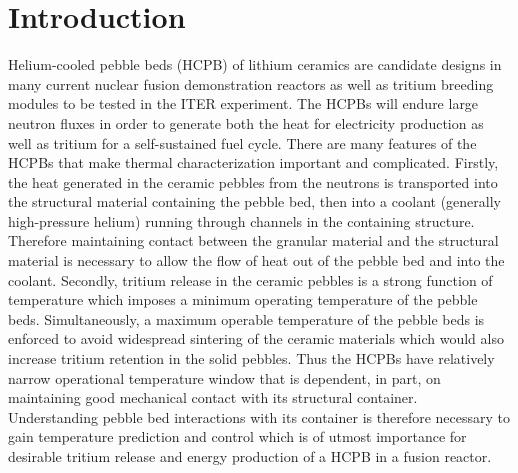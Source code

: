 \chapter{Introduction} \label{sec:introduction}
Helium-cooled pebble beds (HCPB) of lithium ceramics are candidate designs in many current nuclear fusion demonstration reactors as well as tritium breeding modules to be tested in the ITER experiment. The HCPBs will endure large neutron fluxes in order to generate both the heat for electricity production as well as tritium for a self-sustained fuel cycle. There are many features of the HCPBs that make thermal characterization important and complicated. Firstly, the heat generated in the ceramic pebbles from the neutrons is transported into the structural material containing the pebble bed, then into a coolant (generally high-pressure helium) running through channels in the containing structure. Therefore maintaining contact between the granular material and the structural material is necessary to allow the flow of heat out of the pebble bed and into the coolant. Secondly, tritium release in the ceramic pebbles is a strong function of temperature which imposes a minimum operating temperature of the pebble beds. Simultaneously, a maximum operable temperature of the pebble beds is enforced to avoid widespread sintering of the ceramic materials which would also increase tritium retention in the solid pebbles. Thus the HCPBs have relatively narrow operational temperature window that is dependent, in part, on maintaining good mechanical contact with its structural container. Understanding pebble bed interactions with its container is therefore necessary to gain temperature prediction and control which is of utmost importance for desirable tritium release and energy production of a HCPB in a fusion reactor.

